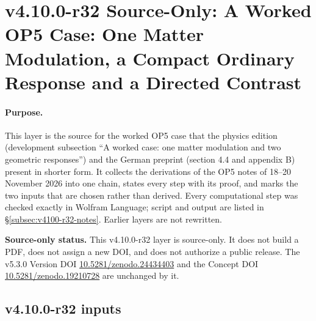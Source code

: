 \clearpage
\section*{v4.10.0-r32 Source-Only: A Worked OP5 Case: One Matter Modulation, a Compact Ordinary Response and a Directed Contrast}
\label{sec:v4100-r32-op5-worked-case}

\paragraph{Purpose.}
This layer is the source for the worked OP5 case that the physics edition (development subsection ``A worked case: one matter
modulation and two geometric responses'') and the German preprint (section 4.4 and appendix B) present in shorter form.  It collects
the derivations of the OP5 notes of 18--20 November 2026 into one chain, states every step with its proof, and marks the two inputs
that are chosen rather than derived.  Every computational step was checked exactly in Wolfram Language; script and output are listed
in \S\ref{subsec:v4100-r32-notes}.  Earlier layers are not rewritten.

\noindent\textbf{Source-only status.}
This v4.10.0-r32 layer is source-only.  It does not build a PDF, does not assign a new DOI,
and does not authorize a public release.  The v5.3.0 Version DOI
\href{https://doi.org/10.5281/zenodo.24434403}{10.5281/zenodo.24434403} and the Concept DOI
\href{https://doi.org/10.5281/zenodo.19210728}{10.5281/zenodo.19210728} are unchanged by it.

\subsection*{v4.10.0-r32 inputs}
\label{subsec:v4100-r32-inputs}

